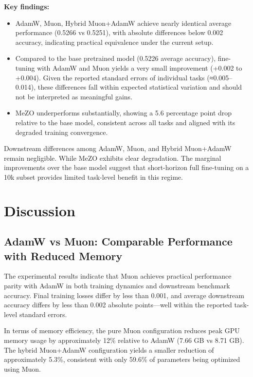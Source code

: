 \documentclass{article}
\begin{document}
\textbf{Key findings:}
\begin{itemize}
    \item AdamW, Muon, Hybrid Muon+AdamW achieve nearly identical average performance (0.5266 vs 0.5251), with absolute differences below 0.002 accuracy, indicating practical equivalence under the current setup.
    
    \item Compared to the base pretrained model (0.5226 average accuracy), fine-tuning with AdamW and Muon yields a very small improvement (+0.002 to +0.004). Given the reported standard errors of individual tasks (≈0.005–0.014), these differences fall within expected statistical variation and should not be interpreted as meaningful gains.
    
    \item MeZO underperforms substantially, showing a 5.6 percentage point drop relative to the base model, consistent across all tasks and aligned with its degraded training convergence.
\end{itemize}

Downstream differences among AdamW, Muon, and Hybrid Muon+AdamW remain negligible. While MeZO exhibits clear degradation. The marginal improvements over the base model suggest that short-horizon full fine-tuning on a 10k subset provides limited task-level benefit in this regime.

\section{Discussion}

\subsection{AdamW vs Muon: Comparable Performance with Reduced Memory}

The experimental results indicate that Muon achieves practical performance parity with AdamW in both training dynamics and downstream benchmark accuracy. Final training losses differ by less than 0.001, and average downstream accuracy differs by less than 0.002 absolute points—well within the reported task-level standard errors.

In terms of memory efficiency, the pure Muon configuration reduces peak GPU memory usage by approximately 12\% relative to AdamW (7.66 GB vs 8.71 GB). The hybrid Muon+AdamW configuration yields a smaller reduction of approximately 5.3\%, consistent with only 59.6\% of parameters being optimized using Muon.
\end{document}
